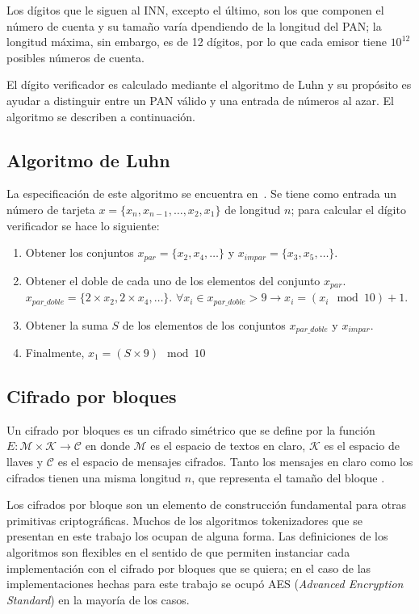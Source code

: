   Los dígitos que le siguen al INN, excepto el último, son los que componen el
  número de cuenta y su tamaño varía dpendiendo de la longitud del PAN; la
  longitud máxima, sin embargo, es de 12 dígitos, por lo que cada emisor tiene
  $10^{12}$ posibles números de cuenta.

  El dígito verificador es calculado mediante el algoritmo de Luhn y su
  propósito es ayudar a distinguir entre un PAN válido y una entrada de números
  al azar. El algoritmo se describen a continuación.

  \subsection{Algoritmo de Luhn}
  \label{subsec:algoritmo_luhn}
  La especificación de este algoritmo se encuentra en~\cite{iso_7812}. Se tiene
  como entrada un número de tarjeta $ x = \{x_n, x_{n-1}, \dots, x_2, x_1\}$ de
  longitud $ n $; para calcular el dígito verificador se hace lo siguiente:
  \begin{enumerate}
    \item Obtener los conjuntos $x_{par} = \{x_2, x_4, \dots\}$ y
      $x_{impar} = \{x_3, x_5, \dots\}$.
    \item Obtener el doble de cada uno de los elementos del conjunto $x_{par}$.
      $x_{par\_doble} = \{2 \times x_2, 2 \times x_4, \dots\}$.
      $\forall x_i \in x_{par\_doble} > 9 \rightarrow x_i = (x_i \mod 10) + 1$.
    \item Obtener la suma $ S $ de los elementos de los conjuntos $x_{par\_doble}$ y
      $x_{impar}$.
    \item Finalmente, $x_1 = (S \times 9) \mod 10$
  \end{enumerate}


\subsection{Cifrado por bloques}

Un cifrado por bloques es un cifrado simétrico que se define por la función $ E:
\mathcal{M} \times \mathcal{K} \rightarrow \mathcal{C} $ en donde $ \mathcal{M} $
es el espacio de textos en claro, $ \mathcal{K} $ es el espacio de llaves y $
\mathcal{C} $ es el espacio de mensajes cifrados. Tanto los mensajes en claro
como los cifrados tienen una misma longitud $ n $, que representa el tamaño del
bloque \cite{menezes}.

Los cifrados por bloque son un elemento de construcción fundamental para otras
primitivas criptográficas. Muchos de los algoritmos tokenizadores que se
presentan en este trabajo los ocupan de alguna forma. Las definiciones de los
algoritmos son flexibles en el sentido de que permiten instanciar cada
implementación con el cifrado por bloques que se quiera; en el caso de las
implementaciones hechas para este trabajo se ocupó AES (\textit{Advanced
Encryption Standard}) en la mayoría de los casos.

